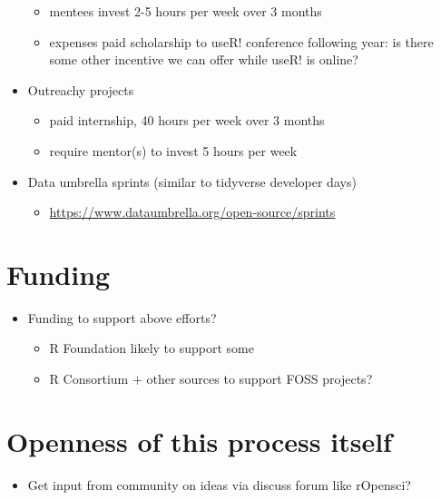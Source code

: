 \documentclass[]{book}
\providecommand{\tightlist}{%
  \setlength{\itemsep}{0pt}\setlength{\parskip}{0pt}}
\begin{document}
\begin{itemize}
  \begin{itemize}
  \tightlist
  \item
    mentees invest 2-5 hours per week over 3 months
  \item
    expenses paid scholarship to useR! conference following year: is there some other incentive we can offer while useR! is online?
  \end{itemize}
\item
  Outreachy projects

  \begin{itemize}
  \tightlist
  \item
    paid internship, 40 hours per week over 3 months
  \item
    require mentor(s) to invest 5 hours per week
  \end{itemize}
\item
  Data umbrella sprints (similar to tidyverse developer days)

  \begin{itemize}
  \tightlist
  \item
    \url{https://www.dataumbrella.org/open-source/sprints}
  \end{itemize}
\end{itemize}

\hypertarget{funding}{%
\chapter{Funding}\label{funding}}

\begin{itemize}
\tightlist
\item
  Funding to support above efforts?

  \begin{itemize}
  \tightlist
  \item
    R Foundation likely to support some
  \item
    R Consortium + other sources to support FOSS projects?
  \end{itemize}
\end{itemize}

\hypertarget{openness-of-this-process-itself}{%
\chapter{Openness of this process itself}\label{openness-of-this-process-itself}}

\begin{itemize}
\tightlist
\item
  Get input from community on ideas via discuss forum like rOpensci?
\end{itemize}
\end{document}
